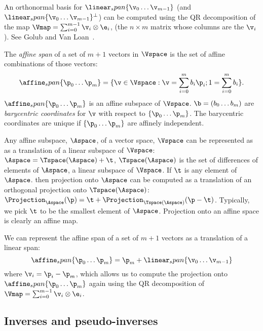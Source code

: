 An orthonormal basis for $\linear_span\{ \v_0 \ldots \v_{m-1} \}$
(and $\linear_span\{ \v_0 \ldots \v_{m-1} \}^\perp$)
can be computed using the QR decomposition
of the map $\Vmap = \sum_{i=0}^{m-1} \v_i \otimes \e_i$,
(the $n \times m$ matrix whose columns are the $\v_i$).
See Golub and Van Loan~\cite[sec.~5.2]{GolubVanLoan:1996}.

The {\it affine span} of a set of $m+1$ vectors in $\Vspace$
is the set of affine combinations of those vectors:
\begin{equation}
\affine_span\{ \p_0 \ldots \p_{m} \} = \{\v \in \Vspace : \v = \sum_{i=0}^{m} b_i \p_i;
1 = \sum_{i=0}^{m} b_i \}.
\end{equation}
$\affine_span\{ \p_0 \ldots \p_{m} \}$ is an affine subspace of $\Vspace$.
$\b = ( b_0 \ldots b_m )$ are {\it barycentric coordinates}
for $\v$ with respect to $\{ \p_0 \ldots \p_{m} \}$.
The barycentric coordinates are unique if $\{ \p_0 \ldots \p_{m} \}$
are affinely independent.

Any affine subspace, $\Aspace$, of a vector space, $\Vspace$ can be represented as
as a translation of a linear subspace of $\Vspace$:
$\Aspace = \Tspace(\Aspace) + \t$,
$\Tspace(\Aspace)$ is the set of differences of elements of $\Aspace$,
a linear subspace of $\Vspace$.
If $\t$ is any element of $\Aspace$.
then projection onto $\Aspace$
can be computed as a translation of an orthogonal projection onto $\Tspace(\Aspace)$:
$\Projection_{\Aspace} (\p) = \t + \Projection_{\Tspace(\Aspace)} (\p - \t)$.
Typically, we pick $\t$ to be the smallest element of $\Aspace$.
Projection onto an affine space is clearly an affine map.

We can represent the affine span of a set of $m+1$ vectors
as a translation of a linear span:
\begin{equation}
\affine_span\{ \p_0 \ldots \p_{m} \} = \p_m + \linear_span\{\v_0 \ldots \v_{m-1}\}
\end{equation}
where $\v_i = \p_i - \p_m$,
which allows us to compute the projection onto
$\affine_span\{ \p_0 \ldots \p_{m} \}$
again using the QR decomposition
of $\Vmap = \sum_{i=0}^{m-1} \v_i \otimes \e_i$.


\subsection{Inverses and pseudo-inverses}
\label{sec:Inverses-and-pseudo-inverses}

